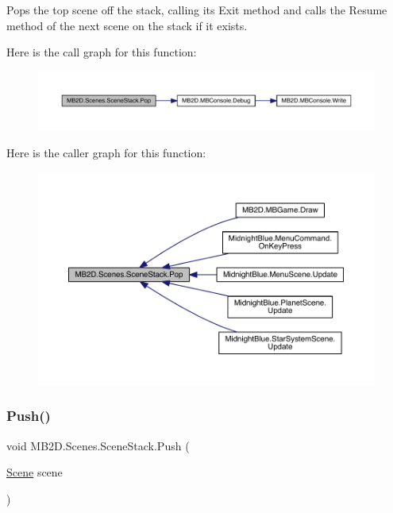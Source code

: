 Pops the top scene off the stack, calling its Exit method and calls the Resume method of the next scene on the stack if it exists. 

Here is the call graph for this function\+:
\nopagebreak
\begin{figure}[H]
\begin{center}
\leavevmode
\includegraphics[width=350pt]{class_m_b2_d_1_1_scenes_1_1_scene_stack_a134c3aff1731fb86116b78cac7112464_cgraph}
\end{center}
\end{figure}
Here is the caller graph for this function\+:
\nopagebreak
\begin{figure}[H]
\begin{center}
\leavevmode
\includegraphics[width=350pt]{class_m_b2_d_1_1_scenes_1_1_scene_stack_a134c3aff1731fb86116b78cac7112464_icgraph}
\end{center}
\end{figure}
\hypertarget{class_m_b2_d_1_1_scenes_1_1_scene_stack_a22760622453ac16621534bc324ec039f}{}\label{class_m_b2_d_1_1_scenes_1_1_scene_stack_a22760622453ac16621534bc324ec039f} 
\subsubsection{\texorpdfstring{Push()}{Push()}}
{\footnotesize\ttfamily void M\+B2\+D.\+Scenes.\+Scene\+Stack.\+Push (\begin{DoxyParamCaption}\item[{\hyperlink{class_m_b2_d_1_1_scenes_1_1_scene}{Scene}}]{scene }\end{DoxyParamCaption})\hspace{0.3cm}{\ttfamily [inline]}}



